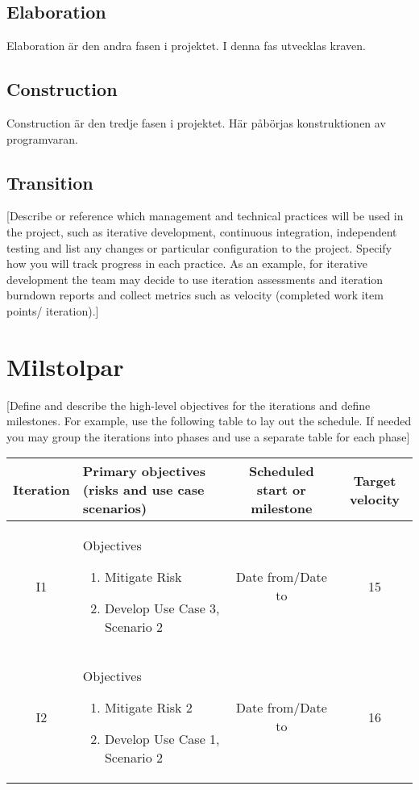 \subsection*{Elaboration}
Elaboration är den andra fasen i projektet. I denna fas utvecklas kraven.

\subsection*{Construction}
Construction är den tredje fasen i projektet. Här påbörjas konstruktionen av programvaran.

\subsection*{Transition}
[Describe or reference which management and technical practices will be used in the project, such as iterative development, continuous integration, independent testing and list any changes or particular configuration to the project. Specify how you will track progress in each practice. As an example, for iterative development the team may decide to use iteration assessments and iteration burndown reports and collect metrics such as velocity (completed work item points/ iteration).]

\section{Milstolpar}
[Define and describe the high-level objectives for the iterations and define milestones. For example, use the following table to lay out the schedule. If needed you may group the iterations into phases and use a separate table for each phase]
\begin{center}
    \begin{tabular}{ | c | m{6cm}  | c | c |}
    \hline
    Iteration & Primary objectives (risks and use case scenarios) & Scheduled start or milestone & Target velocity \\
    \hline
    I1 & Objectives \begin{enumerate} \item Mitigate Risk \item Develop Use Case 3, Scenario 2 \end{enumerate} & Date from/Date to & 15 \\
    \hline
	I2 & Objectives \begin{enumerate} \item Mitigate Risk 2 \item Develop Use Case 1, Scenario 2 \end{enumerate} & Date from/Date to & 16 \\
\hline
    \end{tabular}
\end{center}

